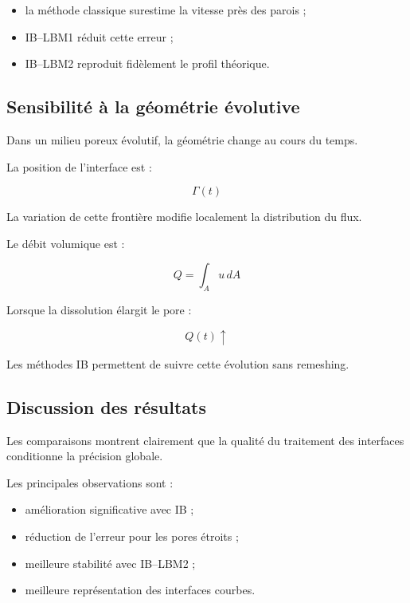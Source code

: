 \documentclass[12pt,a4paper]{report}
\begin{document}
\begin{itemize}
\item la méthode classique surestime la vitesse près des parois ;
\item IB--LBM1 réduit cette erreur ;
\item IB--LBM2 reproduit fidèlement le profil théorique.
\end{itemize}

\subsection{Sensibilité à la géométrie évolutive}

Dans un milieu poreux évolutif, la géométrie change au cours du temps.

La position de l’interface est :

\begin{equation}
\Gamma(t)
\end{equation}

La variation de cette frontière modifie localement la distribution du flux.

Le débit volumique est :

\begin{equation}
Q
=
\int_A u\,dA
\end{equation}

Lorsque la dissolution élargit le pore :

\begin{equation}
Q(t)
\uparrow
\end{equation}

Les méthodes IB permettent de suivre cette évolution sans remeshing.

\subsection{Discussion des résultats}

Les comparaisons montrent clairement que la qualité du traitement des interfaces conditionne la précision globale.

Les principales observations sont :

\begin{itemize}
\item amélioration significative avec IB ;
\item réduction de l’erreur pour les pores étroits ;
\item meilleure stabilité avec IB--LBM2 ;
\item meilleure représentation des interfaces courbes.
\end{itemize}
\end{document}
